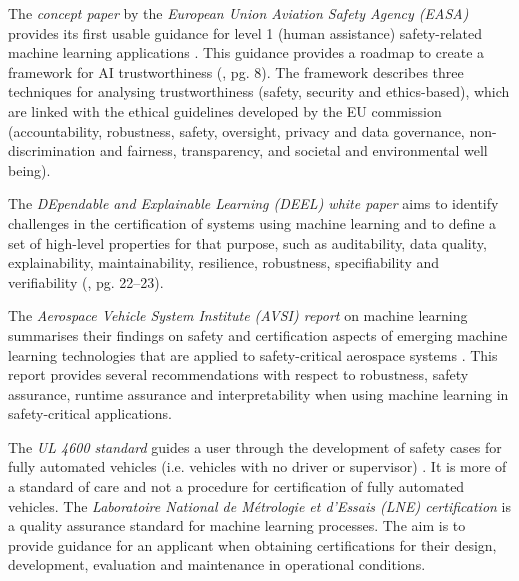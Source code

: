 The \textit{concept paper} by the \textit{European Union Aviation Safety Agency (EASA)} provides its first usable guidance for level 1 (human assistance) safety-related machine learning applications \cite{EASA2021}. 
This guidance provides a roadmap to create a framework for AI trustworthiness (\cite{EASA2021}, pg. 8). The framework describes three techniques for analysing trustworthiness (safety, security and ethics-based), which are linked with the ethical guidelines developed by the EU commission (accountability, robustness, safety, oversight, privacy and data governance, non-discrimination and fairness, transparency, and societal and environmental well being). 

The \textit{DEpendable and Explainable Learning (DEEL) white paper} aims to identify challenges in the certification of systems using machine learning and to define a set of high-level properties for that purpose, such as auditability, data quality, explainability, maintainability, resilience, robustness, specifiability and verifiability (\cite{Mamalet2021}, pg. 22–23). 

The \textit{Aerospace Vehicle System Institute (AVSI) report} on machine learning summarises their findings on safety and certification aspects of emerging machine learning technologies that are applied to safety-critical aerospace systems \cite{AFE2020}. This report provides several recommendations with respect to robustness, safety assurance, runtime assurance and interpretability when using machine learning in safety-critical applications. 

The \textit{UL 4600 standard} guides a user through the development of safety cases for fully automated vehicles (i.e. vehicles with no driver or supervisor) \cite{UL4600}. It is more of a standard of care and not a procedure for certification of fully automated vehicles. The \textit{Laboratoire National de Métrologie et d'Essais (LNE) certification} \cite{LNE2021} is a quality assurance standard for machine learning processes. The aim is to provide guidance for an applicant when obtaining certifications for their design, development, evaluation and maintenance in operational conditions. 

